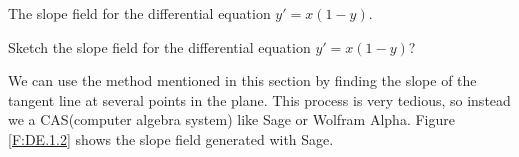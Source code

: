 \begin{marginfigure} %
\caption{The slope field for the differential equation $y' = x(1-y)$.} \label{F:6.6.Eg2}
\end{marginfigure}

\begin{example} \label{eg:DE.1.2} %
Sketch the slope field for the differential equation $y' = x(1-y)$?

\solution We can use the method mentioned in this section by finding the slope of the tangent line at several points in the plane. This process is very tedious, so instead we a CAS(computer algebra system) like Sage or Wolfram Alpha. Figure \ref{F:DE.1.2} shows the slope field generated with Sage. 
\end{example}